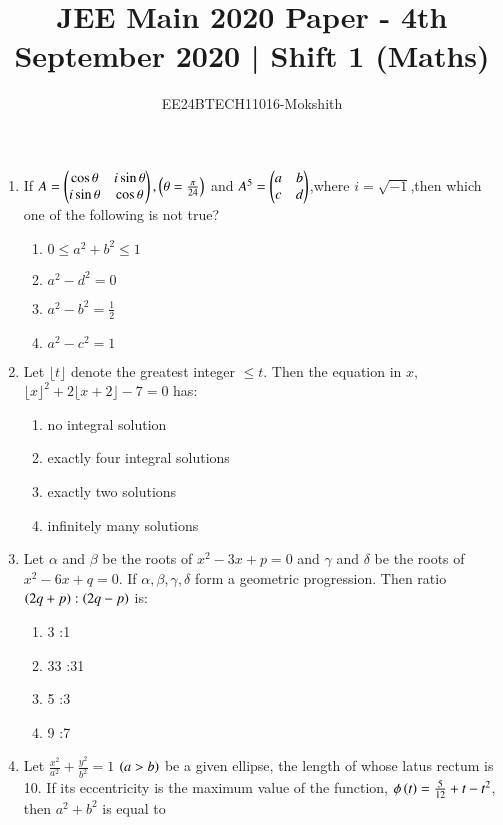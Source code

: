 \documentclass[journal]{IEEEtran}
\begin{document}

\title{JEE Main 2020 Paper - 4th September 2020 | Shift 1 (Maths)}
\author{EE24BTECH11016-Mokshith}
{\let\newpage\relax\maketitle}
\renewcommand{\thefigure}{\theenumi}
\renewcommand{\thetable}{\theenumi}
\setlength{\intextsep}{10pt} %
\renewcommand{\thetable}{\theenumi}

\begin{enumerate}
\item If $A=\begin{pmatrix}\cos\theta&i\sin\theta\\i\sin\theta&\cos\theta\end{pmatrix},\left(\theta=\frac{\pi}{24}\right)$ and $A^5=\begin{pmatrix}a&b\\c&d\end{pmatrix}$,where $i=\sqrt{-1}$,then which one of the following is not true?
\begin{enumerate}
    \item $0\leq a^2+b^2\leq1$
    \item $a^2-d^2=0$
    \item $a^2-b^2=\frac{1}{2}$
    \item $a^2-c^2=1$
\end{enumerate}
\item Let $\lfloor t\rfloor$ denote the greatest integer $\leq t$. Then the equation in $x$,$\lfloor x\rfloor^2+2\lfloor x+2\rfloor-7=0$ has:
\begin{enumerate}
    \item no integral solution
    \item exactly four integral solutions
    \item exactly two solutions
    \item infinitely many solutions
    \end{enumerate}
\item Let $\alpha$ and $\beta$ be the roots of $x^2-3x+p=0$ and $\gamma$ and $\delta$ be the roots of $x^2-6x+q=0$. If $\alpha,\beta,\gamma,\delta$ form a geometric progression. Then ratio $\left(2q+p\right):\left(2q-p\right)$ is:
\begin{enumerate}
    \item 3 :1
    \item 33 :31
    \item 5 :3
    \item 9 :7
\end{enumerate}
\item Let $\frac{x^2}{a^2}+\frac{y^2}{b^2}=1$ $\left(a>b\right)$ be a given ellipse, the length of whose latus rectum is 10. If its eccentricity is the maximum value of the function, $\phi\left(t\right)=\frac{5}{12}+t-t^2$, then $a^2 + b^2$ is equal to

\end{enumerate}
\end{document}
